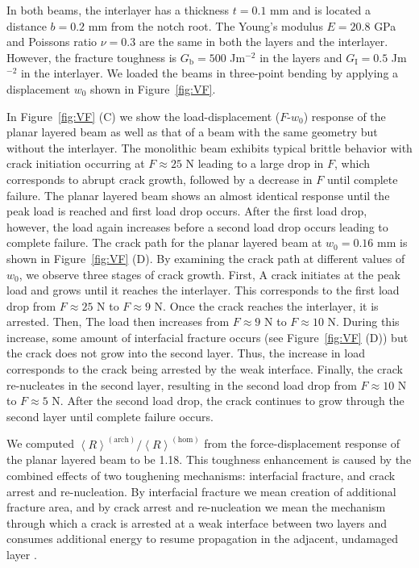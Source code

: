 \documentclass[12pt,onecolumn]{article}
\begin{document}
\begin{bibunit}
In both beams, the interlayer has a thickness $t = 0.1$ mm and is located a distance $b = 0.2$ mm from the notch root. The Young's modulus $E = 20.8$ GPa and Poissons ratio $\nu = 0.3$ are the same in both the layers and the interlayer. However, the fracture toughness is $G_\mathrm{b} = 500$ Jm$^{-2}$ in the layers and $G_\mathrm{I} = 0.5$ Jm$^{-2}$ in the interlayer. We loaded the beams in three-point bending by applying a displacement $w_0$ shown in Figure~\ref{fig:VF}. 

In Figure~\ref{fig:VF} (C) we show the load-displacement ($F$-$w_0$) response of the planar layered beam as well as that of a beam with the same geometry but without the interlayer. The monolithic beam exhibits typical brittle behavior with crack initiation occurring at $F\approx25$ N leading to a large drop in $F$, which corresponds to abrupt crack growth, followed by a decrease in $F$ until complete failure. The planar layered beam shows an almost identical response until the peak load is reached and first load drop occurs. After the first load drop, however, the load again increases before a second load drop occurs leading to complete failure. The crack path for the planar layered beam at $w_0 = 0.16$ mm is shown in Figure~\ref{fig:VF} (D). By examining the crack path at different values of $w_0$, we observe three stages of crack growth. First, A crack initiates at the peak load and grows until it reaches the interlayer. This corresponds to the first load drop from $F \approx 25$ N to $F \approx 9$ N. Once the crack reaches the interlayer, it is arrested. Then, The load then increases from $F \approx 9$ N to $F \approx 10$ N. During this increase, some amount of interfacial fracture occurs (see Figure~\ref{fig:VF} (D)) but the crack does not grow into the second layer. Thus, the increase in load corresponds to the crack being arrested by the weak interface. Finally, the crack re-nucleates in the second layer, resulting in the second load drop from $F \approx 10$ N to $F \approx 5$ N. After the second load drop, the crack continues to grow through the second layer until complete failure occurs.


We computed $\left< R\right>^{(\mathrm{arch})}/\left< R\right>^{(\mathrm{hom})}$ from the force-displacement response of the planar layered beam to be 1.18. This toughness enhancement is caused by the combined effects of two toughening mechanisms: interfacial fracture, and crack arrest and re-nucleation. By interfacial fracture we mean creation of additional fracture area, and by crack arrest and re-nucleation we mean the mechanism through which a crack is arrested at a weak interface between two layers and consumes additional energy to resume propagation in the adjacent, undamaged layer \cite{cook1964mechanism,jackson1988,currey1977,kuhn1996fracture, kamat2000structural}.


\end{bibunit}
\end{document}

